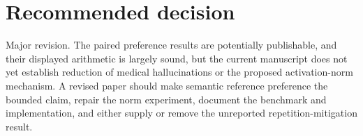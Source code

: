 \documentclass[11pt]{article}
\begin{document}
\section*{Recommended decision}

Major revision.  The paired preference results are potentially publishable, and their displayed arithmetic is largely sound, but the current manuscript does not yet establish reduction of medical hallucinations or the proposed activation-norm mechanism.  A revised paper should make semantic reference preference the bounded claim, repair the norm experiment, document the benchmark and implementation, and either supply or remove the unreported repetition-mitigation result.
\end{document}
